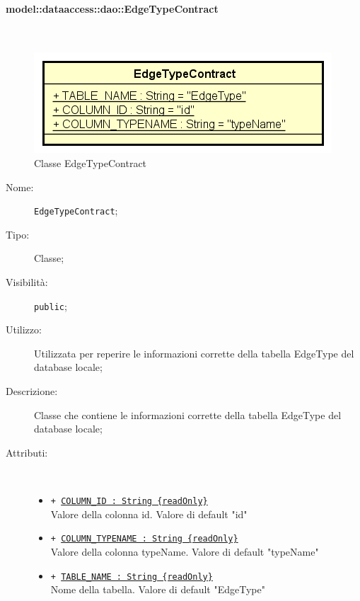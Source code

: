 \documentclass[../DefinizioneDiProdotto.tex]{subfiles}
\begin{document}
\paragraph{model::dataaccess::dao::EdgeTypeContract}
\
\begin{figure}[H]
	\centering
	\includegraphics[width=\maxwidth]{img/EdgeTypeContract.png}
	\caption{Classe EdgeTypeContract}\label{fig:model::dataaccess::dao::EdgeTypeContract} 
\end{figure}
\begin{description}
	\item[Nome:] \texttt{EdgeTypeContract};
	\item[Tipo:] Classe;
	\item[Visibilità:] \texttt{public};
	\item[Utilizzo:] Utilizzata per reperire le informazioni corrette della tabella EdgeType del database locale;
	\item[Descrizione:] Classe che contiene le informazioni corrette della tabella EdgeType del database locale;
	\item[Attributi:] \
	\begin{itemize}
		\item \texttt{+ \underline{COLUMN\_ID : String \{readOnly\}}}\\
		Valore della colonna id. Valore di default "id"
		
		\item \texttt{+ \underline{COLUMN\_TYPENAME : String \{readOnly\}}}\\
		Valore della colonna typeName. Valore di default "typeName"
		
		\item \texttt{+ \underline{TABLE\_NAME : String \{readOnly\}}}\\
		Nome della tabella. Valore di default "EdgeType"
		
	\end{itemize}
\end{description}
\end{document}
